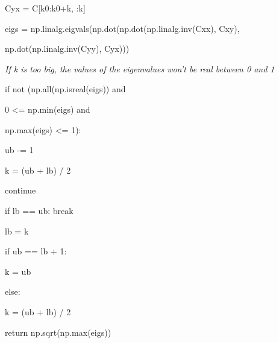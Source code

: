 \documentclass[11pt,twoside,a4paper]{article}
\begin{document}
\begin{flushleft}
\hspace*{50}		Cyx = C[k0:k0+k, :k]

\hspace*{50}		eigs = np.linalg.eigvals(np.dot(np.dot(np.linalg.inv(Cxx), Cxy),

	\hspace*{50}	                                np.dot(np.linalg.inv(Cyy), Cyx)))

\textit{If k is too big, the values of the eigenvalues won't be real between 0 and 1}

\hspace*{50}		if not (np.all(np.isreal(eigs)) and

\hspace*{50}\hspace*{25}				0 <= np.min(eigs) and

\hspace*{50}\hspace*{25}				np.max(eigs) <= 1):

\hspace*{50}\hspace*{50}			ub -= 1

\hspace*{50}\hspace*{50}			k = (ub + lb) / 2

\hspace*{50}\hspace*{50}			continue

\hspace*{50}		if lb == ub: break

\hspace*{50}		lb = k

\hspace*{50}		if ub == lb + 1:

\hspace*{50}\hspace*{50}			k = ub

\hspace*{50}		else:

\hspace*{50}\hspace*{50}			k = (ub + lb) / 2

	return np.sqrt(np.max(eigs))
	
\end{flushleft}
\end{document}
